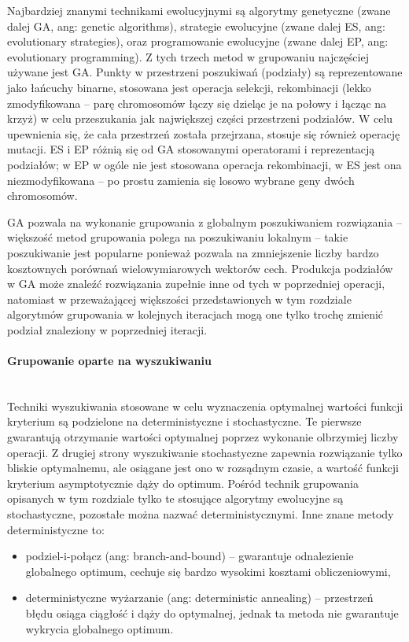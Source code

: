\documentclass{article}
\newcommand{\myparagraph}[1]{\paragraph{#1}\mbox{}\\}
\begin{document}
Najbardziej znanymi technikami ewolucyjnymi są algorytmy genetyczne (zwane dalej GA, ang: genetic algorithms), strategie ewolucyjne (zwane dalej ES, ang: evolutionary strategies), oraz programowanie ewolucyjne (zwane dalej EP, ang: evolutionary programming). Z tych trzech metod w grupowaniu najczęściej używane jest GA. Punkty w przestrzeni poszukiwań (podziały) są reprezentowane jako łańcuchy binarne, stosowana jest operacja selekcji, rekombinacji (lekko zmodyfikowana – parę chromosomów łączy się dzieląc je na połowy i łącząc na krzyż) w celu przeszukania jak największej części przestrzeni podziałów. W celu upewnienia się, że cała przestrzeń została przejrzana, stosuje się również operację mutacji. ES i EP różnią się od GA stosowanymi operatorami i reprezentacją podziałów; w EP w ogóle nie jest stosowana operacja rekombinacji, w ES jest ona niezmodyfikowana – po prostu zamienia się losowo wybrane geny dwóch chromosomów. 

GA pozwala na wykonanie grupowania z globalnym poszukiwaniem rozwiązania – większość metod grupowania polega na poszukiwaniu lokalnym – takie poszukiwanie jest popularne ponieważ pozwala na zmniejszenie liczby bardzo kosztownych porównań wielowymiarowych wektorów cech. Produkcja podziałów w GA może znaleźć rozwiązania zupełnie inne od tych w poprzedniej operacji, natomiast w przeważającej większości przedstawionych w tym rozdziale algorytmów grupowania w kolejnych iteracjach mogą one tylko trochę zmienić podział znaleziony w poprzedniej iteracji. 

\myparagraph{Grupowanie oparte na wyszukiwaniu}

Techniki wyszukiwania stosowane w celu wyznaczenia optymalnej wartości funkcji kryterium są podzielone na deterministyczne i stochastyczne. Te pierwsze gwarantują otrzymanie wartości optymalnej poprzez wykonanie olbrzymiej liczby operacji. Z drugiej strony wyszukiwanie stochastyczne zapewnia rozwiązanie tylko bliskie optymalnemu, ale osiągane jest ono w rozsądnym czasie, a wartość funkcji kryterium asymptotycznie dąży do optimum. Pośród technik grupowania opisanych w tym rozdziale tylko te stosujące algorytmy ewolucyjne są stochastyczne, pozostałe można nazwać deterministycznymi. Inne znane metody deterministyczne to:

\begin{itemize}
	\item podziel-i-połącz (ang: branch-and-bound) – gwarantuje odnalezienie globalnego optimum, cechuje się bardzo wysokimi kosztami obliczeniowymi,
	\item deterministyczne wyżarzanie (ang: deterministic annealing) – przestrzeń błędu osiąga ciągłość i dąży do optymalnej, jednak ta metoda nie gwarantuje wykrycia globalnego optimum.
\end{itemize}
\end{document}

